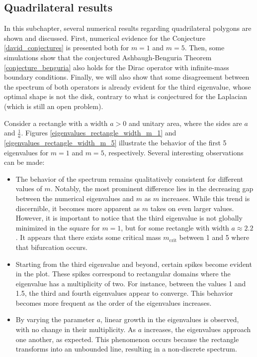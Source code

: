 \subsection{Quadrilateral results}

In this subchapter, several numerical results regarding quadrilateral polygons are shown and discussed. First, numerical evidence for the Conjecture \ref{david_conjectures} is presented both for \(m=1\) and \(m=5\). Then, some simulations show that the conjectured Ashbaugh-Benguria Theorem \ref{conjecture_benguria} also holds for the Dirac operator with infinite-mass boundary conditions. Finally, we will also show that some disagreement between the spectrum of both operators is already evident for the third eigenvalue, whose optimal shape is not the disk, contrary to what is conjectured for the Laplacian (which is still an open problem).

Consider a rectangle with a width \(a > 0\) and unitary area, where the sides are \(a\) and \(\frac{1}{a}\). Figures \ref{eigenvalues_rectangle_width_m_1} and \ref{eigenvalues_rectangle_width_m_5} illustrate the behavior of the first 5 eigenvalues for \(m=1\) and \(m=5\), respectively. Several interesting observations can be made:

\begin{itemize}
  \item The behavior of the spectrum remains qualitatively consistent for different values of \(m\). Notably, the most prominent difference lies in the decreasing gap between the numerical eigenvalues and \(m\) as \(m\) increases. While this trend is discernible, it becomes more apparent as \(m\) takes on even larger values. However, it is important to notice that the third eigenvalue is not globally minimized in the square for \(m=1\), but for some rectangle with width \(a \approx 2.2\). It appears that there exists some critical mass \(m_{\text{crit}}\) between 1 and 5 where that bifurcation occurs. 
  
  \item Starting from the third eigenvalue and beyond, certain spikes become evident in the plot. These spikes correspond to rectangular domains where the eigenvalue has a multiplicity of two. For instance, between the values 1 and 1.5, the third and fourth eigenvalues appear to converge. This behavior becomes more frequent as the order of the eigenvalues increases.
  
  \item By varying the parameter \(a\), linear growth in the eigenvalues is observed, with no change in their multiplicity. As \(a\) increases, the eigenvalues approach one another, as expected. This phenomenon occurs because the rectangle transforms into an unbounded line, resulting in a non-discrete spectrum.
\end{itemize}

